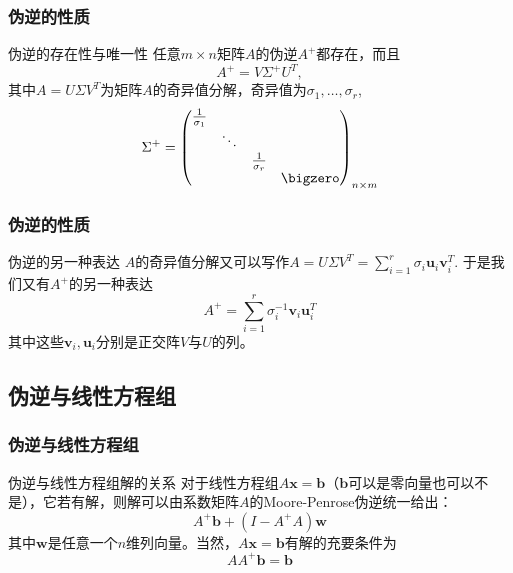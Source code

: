 
\begin{frame}
\frametitle{伪逆的性质}

\begin{block}{伪逆的存在性与唯一性}
任意$m\times n$矩阵$A$的伪逆$A^+$都存在，而且
$$A^+ = V\Sigma^+U^T,$$
其中$A = U\Sigma V^T$为矩阵$A$的奇异值分解，奇异值为$\sigma_1, \ldots, \sigma_r$,
$$\Sigma^+ = \begin{pmatrix}
\frac{1}{\sigma_1} & & & \\ & \ddots & & \\ & & \frac{1}{\sigma_r} & \\ & & & \bigzero \end{pmatrix}_{n\times m}$$
\end{block}

\end{frame}


\begin{frame}
\frametitle{伪逆的性质}

\begin{block}{伪逆的另一种表达}
$A$的奇异值分解又可以写作\(\displaystyle A = U\Sigma V^T = \sum\limits_{i=1}^r \sigma_i \mathbf{u}_i \mathbf{v}_i^T \). 于是我们又有$A^+$的另一种表达
$$A^+ = \sum\limits_{i=1}^r \sigma_i^{-1} \mathbf{v}_i \mathbf{u}_i^T$$
其中这些$\mathbf{v}_i, \mathbf{u}_i$分别是正交阵$V$与$U$的列。
\end{block}

\end{frame}


\subsection{伪逆与线性方程组}


\begin{frame}
\frametitle{伪逆与线性方程组}

\begin{block}{伪逆与线性方程组解的关系}
对于线性方程组$A\mathbf{x} = \mathbf{b}$（$\mathbf{b}$可以是零向量也可以不是），它若有解，则解可以由系数矩阵$A$的Moore-Penrose伪逆统一给出：
$$A^+\mathbf{b} + (I - A^+A)\mathbf{w}$$
其中$\mathbf{w}$是任意一个$n$维列向量。当然，$A\mathbf{x} = \mathbf{b}$有解的充要条件为
$$AA^+\mathbf{b} = \mathbf{b}$$
\end{block}

\end{frame}

